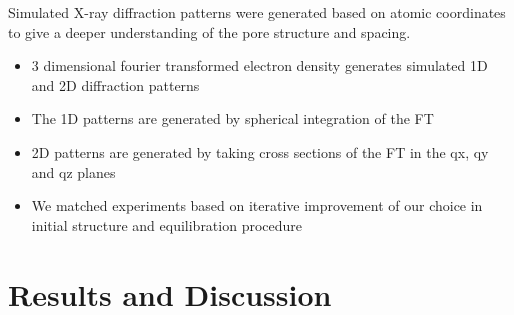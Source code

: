 \documentclass{article}
\begin{document}
	Simulated X-ray diffraction patterns were generated based on atomic coordinates to give a deeper understanding of the pore structure and spacing. 
        \begin{itemize}
               \item 3 dimensional fourier transformed electron density generates simulated 1D and 2D diffraction patterns
               \item The 1D patterns are generated by spherical integration of the FT
               \item 2D patterns are generated by taking cross sections of the FT in the qx, qy and qz planes
               \item We matched experiments based on iterative improvement of our choice in initial structure and equilibration procedure
        \end{itemize}

	\section{Results and Discussion}
	
\end{document}
